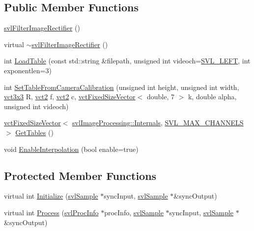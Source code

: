 \subsection*{Public Member Functions}
\begin{DoxyCompactItemize}
\item 
\hyperlink{classsvl_filter_image_rectifier_a635a7336fbc13c83da32005df7dc3204}{svl\+Filter\+Image\+Rectifier} ()
\item 
virtual \hyperlink{classsvl_filter_image_rectifier_ae1cd3da5b7b5e1c1386dbc3ef37a51c3}{$\sim$svl\+Filter\+Image\+Rectifier} ()
\item 
int \hyperlink{classsvl_filter_image_rectifier_a76d556231102310b84f15516fd6284f0}{Load\+Table} (const std\+::string \&filepath, unsigned int videoch=\hyperlink{svl_definitions_8h_ab9fec7615f19c8df2919eebcab0b187f}{S\+V\+L\+\_\+\+L\+E\+F\+T}, int exponentlen=3)
\item 
int \hyperlink{classsvl_filter_image_rectifier_a66fac44ec059b58fcff75f9199610075}{Set\+Table\+From\+Camera\+Calibration} (unsigned int height, unsigned int width, \hyperlink{vct_fixed_size_matrix_types_8h_aac4a419dacf9282410675d42ebc86a7c}{vct3x3} R, \hyperlink{vct_fixed_size_vector_types_8h_a88481ac3c794867ba5e4e92624f0d958}{vct2} f, \hyperlink{vct_fixed_size_vector_types_8h_a88481ac3c794867ba5e4e92624f0d958}{vct2} c, \hyperlink{classvct_fixed_size_vector}{vct\+Fixed\+Size\+Vector}$<$ double, 7 $>$ k, double alpha, unsigned int videoch)
\item 
\hyperlink{classvct_fixed_size_vector}{vct\+Fixed\+Size\+Vector}$<$ \hyperlink{classsvl_image_processing_1_1_internals}{svl\+Image\+Processing\+::\+Internals}, \hyperlink{svl_definitions_8h_aa33455b98ecb4e82d81ebcb7e87f3c01}{S\+V\+L\+\_\+\+M\+A\+X\+\_\+\+C\+H\+A\+N\+N\+E\+L\+S} $>$ \hyperlink{classsvl_filter_image_rectifier_a7c3793303f463aca87c1140099fcdafc}{Get\+Tables} ()
\item 
void \hyperlink{classsvl_filter_image_rectifier_a14166cfe052c64b365af6d63a343f8bc}{Enable\+Interpolation} (bool enable=true)
\end{DoxyCompactItemize}
\subsection*{Protected Member Functions}
\begin{DoxyCompactItemize}
\item 
virtual int \hyperlink{classsvl_filter_image_rectifier_a33e7cf150398b3a7448a6147b7130ff3}{Initialize} (\hyperlink{classsvl_sample}{svl\+Sample} $\ast$sync\+Input, \hyperlink{classsvl_sample}{svl\+Sample} $\ast$\&sync\+Output)
\item 
virtual int \hyperlink{classsvl_filter_image_rectifier_ac1b25ed9782f75d8a6011d18152843f6}{Process} (\hyperlink{structsvl_proc_info}{svl\+Proc\+Info} $\ast$proc\+Info, \hyperlink{classsvl_sample}{svl\+Sample} $\ast$sync\+Input, \hyperlink{classsvl_sample}{svl\+Sample} $\ast$\&sync\+Output)
\end{DoxyCompactItemize}
